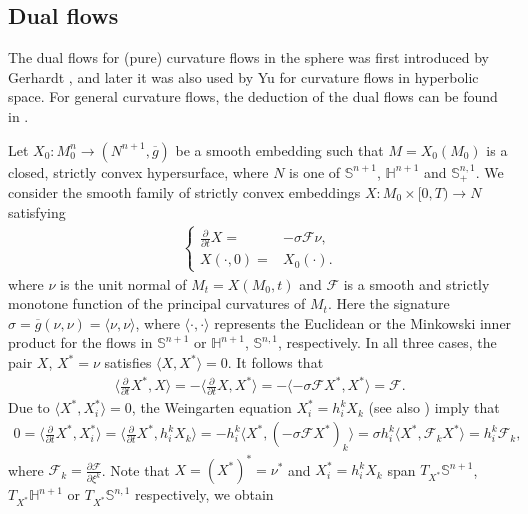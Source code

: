 \documentclass[11pt,reqno]{amsart}
\theoremstyle{definition}
\theoremstyle{remark}
\numberwithin{equation}{section}
\renewcommand{\(}{\left(}
\renewcommand{\)}{\right)}
\renewcommand{\~}{\tilde}
\renewcommand{\-}{\overline}
\newcommand{\s}{\sigma}
\newcommand{\ra}{\rightarrow}
\begin{document}
\subsection{Dual flows}
The dual flows for (pure) curvature flows in the sphere was first introduced by Gerhardt \cite{Ge15}, and later it was also used by Yu \cite{Yu2016} for curvature flows in hyperbolic space. For general curvature flows, the deduction of the dual flows can be found in \cite[(4.3),(4.4)]{Bryan-Ivaki-Scheuer2020}. 

Let $X_0: M_0^n\ra (N^{n+1},\-g)$ be a smooth embedding such that $M=X_0(M_0)$ is a closed, strictly convex hypersurface, where $N$ is one of $\mathbb S^{n+1}$, $\mathbb H^{n+1}$ and $\mathbb S^{n,1}_{+}$. We consider the smooth family of strictly convex embeddings $X:M_0 \times [0,T)\ra N$ satisfying
\begin{align}\label{s2:curvature-flow}
\left\{
\begin{aligned}
\frac{\partial}{\partial t}X=&-\s \mathcal{F}\nu, \\
X(\cdot,0)=&X_0(\cdot).
\end{aligned}\right.
\end{align}
where $\nu$ is the unit normal of $M_t=X(M_0,t)$ and $\mathcal{F}$ is a smooth and strictly monotone function of the principal curvatures of $M_t$. Here the signature $\s=\-g(\nu,\nu)=\langle \nu,\nu \rangle$, where $\langle \cdot,\cdot \rangle$ represents the Euclidean or the Minkowski inner product for the flows in $\mathbb S^{n+1}$ or $\mathbb H^{n+1}$, $\mathbb S^{n,1}$, respectively. In all three cases, the pair $X$, $X^\ast=\nu$ satisfies $\langle X,X^\ast \rangle=0$. It follows that
\begin{align*}
\langle\frac{\partial}{\partial t}X^\ast, X \rangle=-\langle \frac{\partial}{\partial t}X, X^\ast \rangle=-\langle -\s \mathcal{F}X^\ast, X^\ast \rangle =\mathcal{F}.
\end{align*}
Due to $\langle X^\ast,X^\ast_{i} \rangle=0$, the Weingarten equation $X^\ast_i=h_i^k X_k$ (see also \cite[Lemma 9.2.4, Lemma 10.4.3]{Gerh06}) imply that
\begin{align*}
0=\langle \frac{\partial}{\partial t}X^\ast, X^\ast_i \rangle=\langle \frac{\partial}{\partial t}X^\ast, h_i^k X_k\rangle
 =-h_i^k \langle X^\ast, (-\s \mathcal{F} X^\ast)_k\rangle 
 =\s h_i^k \langle X^\ast,  \mathcal{F}_k X^\ast \rangle
 =h_i^k \mathcal{F}_k,
\end{align*}
where $\mathcal{F}_k=\frac{\partial \mathcal{F}}{\partial \xi^k}$. Note that $X=(X^\ast)^\ast=\nu^\ast$ and $X^\ast_{i}=h_i^k X_k$ span $T_{X^\ast}\mathbb S^{n+1}$, $T_{X^\ast}\mathbb H^{n+1}$ or $T_{X^\ast}\mathbb S^{n,1}$ respectively, we obtain
\end{document}
